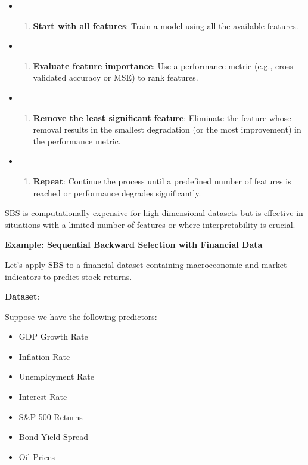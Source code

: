 \documentclass{article}
\providecommand{\tightlist}{%
      \setlength{\itemsep}{0pt}\setlength{\parskip}{0pt}}
\begin{document}
\begin{itemize}
\tightlist
\item
  \begin{enumerate}
  \def\labelenumi{\arabic{enumi}.}
  \tightlist
  \item
    \textbf{Start with all features}: Train a model using all the
    available features.
  \end{enumerate}
\item
  \begin{enumerate}
  \def\labelenumi{\arabic{enumi}.}
  \setcounter{enumi}{1}
  \tightlist
  \item
    \textbf{Evaluate feature importance}: Use a performance metric
    (e.g., cross-validated accuracy or MSE) to rank features.
  \end{enumerate}
\item
  \begin{enumerate}
  \def\labelenumi{\arabic{enumi}.}
  \setcounter{enumi}{2}
  \tightlist
  \item
    \textbf{Remove the least significant feature}: Eliminate the feature
    whose removal results in the smallest degradation (or the most
    improvement) in the performance metric.
  \end{enumerate}
\item
  \begin{enumerate}
  \def\labelenumi{\arabic{enumi}.}
  \setcounter{enumi}{3}
  \tightlist
  \item
    \textbf{Repeat}: Continue the process until a predefined number of
    features is reached or performance degrades significantly.
  \end{enumerate}
\end{itemize}

SBS is computationally expensive for high-dimensional datasets but is
effective in situations with a limited number of features or where
interpretability is crucial.

    \textbf{Example: Sequential Backward Selection with Financial Data}

Let's apply SBS to a financial dataset containing macroeconomic and
market indicators to predict stock returns.

\textbf{Dataset}:

Suppose we have the following predictors:

\begin{itemize}
\tightlist
\item
  GDP Growth Rate
\item
  Inflation Rate
\item
  Unemployment Rate
\item
  Interest Rate
\item
  S\&P 500 Returns
\item
  Bond Yield Spread
\item
  Oil Prices
\end{itemize}
\end{document}
